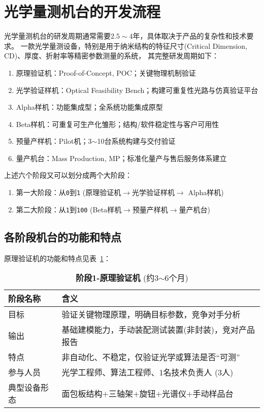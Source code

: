 
\newpage

\section{光学量测机台的开发流程~\label{光学量测机台的开发流程}}
光学量测机台的研发周期通常需要$2.5\sim4$年，具体取决于产品的复杂性和技术要求。
一款光学量测设备，特别是用于纳米结构的特征尺寸(Critical Dimension, CD)、厚度、折射率等精密参数测量的系统，
其完整研发周期如下：
\begin{enumerate}
\setlength{\itemsep}{2pt}
\setlength{\parsep}{0pt}
\setlength{\parskip}{0pt}
\item 原理验证机：Proof-of-Concept, POC；关键物理机制验证 
\item 光学验证样机：Optical Feasibility Bench；构建可重复性光路与仿真验证平台
\item Alpha样机：功能集成型；全系统功能集成原型
\item Beta样机：可重复可生产化雏形；结构/软件稳定性与客户可用性
\item 预量产样机：Pilot机；3$\sim$10台系统构建与交付验证
\item 量产机台：Mass Production, MP；标准化量产与售后服务体系建立
\end{enumerate}
上述六个阶段又可以划分成两个大阶段：
\begin{enumerate}
\setlength{\itemsep}{2pt}
\setlength{\parsep}{0pt}
\setlength{\parskip}{0pt}
\item 第一大阶段：从\texttt{0}到\texttt{1} (原理验证机$\rightarrow$光学验证样机$\rightarrow$ Alpha样机)
\item 第二大阶段：从\texttt{1}到\texttt{100} (Beta样机$\rightarrow$预量产样机$\rightarrow$量产机台)
\end{enumerate}


\subsection{各阶段机台的功能和特点~\label{各阶段机台的功能和特点}}
原理验证机的功能和特点见表~\ref{table:POC}：
\begin{table}[h!]
\centering
\caption{\textbf{阶段1-原理验证机} (约3$\sim$6个月)}
\label{table:POC}
\begin{tabular}{l|l}
\hline\hline
\textbf{阶段名称} & \textbf{含义} \\ \hline
目标 & 验证关键物理原理，明确目标参数，竞争对手分析 \\ \hline
输出 & 基础建模能力，手动装配测试装置(非封装)，竞对产品报告\\ \hline
特点 & 非自动化、不稳定，仅验证光学或算法是否“可测” \\ \hline
参与人员 & 光学工程师、算法工程师、1名技术负责人 (3人) \\ \hline
典型设备形态 & 面包板结构$+$三轴架$+$旋钮$+$光谱仪$+$手动样品台 \\
\hline\hline
\end{tabular}
\end{table}

